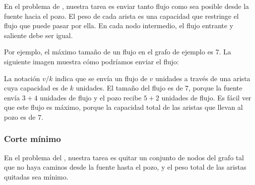 
En el problema de , nuestra tarea es enviar tanto
flujo como sea posible desde la fuente hacia el pozo. El peso de cada
arista es una capacidad que restringe el flujo que puede pasar por ella.
En cada nodo intermedio, el flujo entrante y saliente debe ser igual.

Por ejemplo, el máximo tamaño de un flujo en el grafo de ejemplo es 7.
La siguiente imagen muestra cómo podríamos enviar el flujo:

\begin{center}
\end{center}

La notación $v/k$ indica que se envía un flujo de $v$ unidades
a través de una arista cuya capacidad es de $k$ unidades. El tamaño
del flujo es de $7$, porque la fuente envía $3+4$ unidades de flujo
y el pozo recibe $5+2$ unidades de flujo. Es fácil ver que este
flujo es máximo, porque la capacidad total de las aristas que llevan
al pozo es de $7$.

\subsubsection{Corte mínimo}


En el problema del , nuestra tarea es quitar un
conjunto de nodos del grafo tal que no haya caminos desde la fuente
hasta el pozo, y el peso total de las aristas quitadas sea mínimo.

